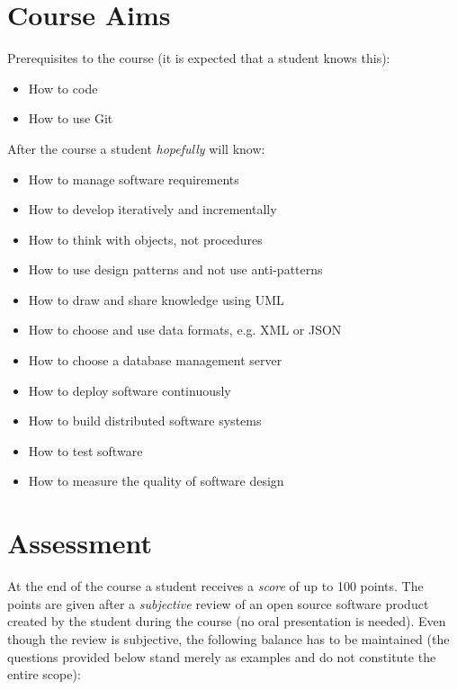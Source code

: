 \documentclass[nobrand,anonymous,nodate,nosecurity]{huawei}
\begin{document}
\newpage
\section*{Course Aims}

Prerequisites to the course (it is expected that a student knows this):

\begin{itemize}
\item How to code
\item How to use Git
\end{itemize}

After the course a student \emph{hopefully} will know:

\begin{itemize}
\item How to manage software requirements
\item How to develop iteratively and incrementally
\item How to think with objects, not procedures
\item How to use design patterns and not use anti-patterns
\item How to draw and share knowledge using UML
\item How to choose and use data formats, e.g. XML or JSON
\item How to choose a database management server
\item How to deploy software continuously
\item How to build distributed software systems
\item How to test software
\item How to measure the quality of software design
\end{itemize}

\newpage
\section*{Assessment}

At the end of the course a student receives a \emph{score} of up
to 100 points. The points are given after a \emph{subjective} review
of an open source software product created by the student during the
course (no oral presentation is needed).
Even though the review is subjective, the following
balance has to be maintained (the questions provided below
stand merely as examples and do not constitute the entire scope):
\end{document}
